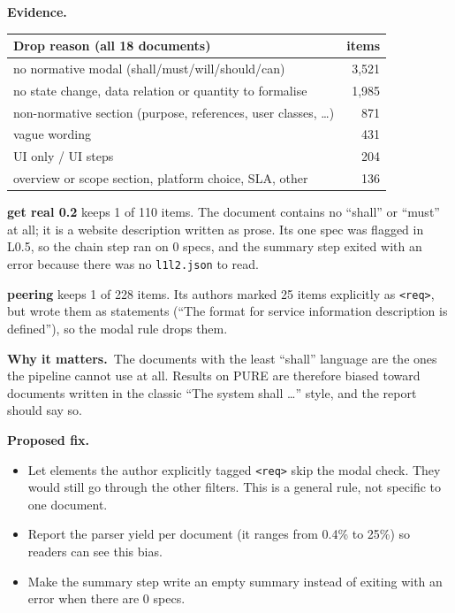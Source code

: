 \documentclass[10pt,a4paper]{article}
\newcommand{\code}[1]{\texttt{\small #1}}
\newcommand{\evidence}{\par\smallskip\textbf{Evidence.}~}
\newcommand{\why}{\par\smallskip\textbf{Why it matters.}~}
\newcommand{\fix}{\par\smallskip\textbf{Proposed fix.}~}
\begin{document}
\evidence
\begin{center}
\begin{tabular}{@{}lr@{}}
\toprule
Drop reason (all 18 documents) & items \\
\midrule
no normative modal (shall/must/will/should/can)                  & 3{,}521 \\
no state change, data relation or quantity to formalise          & 1{,}985 \\
non-normative section (purpose, references, user classes, \dots) & 871 \\
vague wording                                                    & 431 \\
UI only / UI steps                                               & 204 \\
overview or scope section, platform choice, SLA, other           & 136 \\
\bottomrule
\end{tabular}
\end{center}
\textbf{get real 0.2} keeps 1 of 110 items. The document contains no ``shall'' or ``must'' at all; it is a website description
written as prose. Its one spec was flagged in L0.5, so the chain step ran on 0 specs, and the summary step exited with an
error because there was no \code{l1l2.json} to read.

\textbf{peering} keeps 1 of 228 items. Its authors marked 25 items explicitly as \code{<req>}, but wrote them as statements
(``The format for service information description is defined''), so the modal rule drops them.

\why The documents with the least ``shall'' language are the ones the pipeline cannot use at all. Results on PURE are
therefore biased toward documents written in the classic ``The system shall \dots'' style, and the report should say so.

\fix
\begin{itemize}
\item Let elements the author explicitly tagged \code{<req>} skip the modal check. They would still go through the other
      filters. This is a general rule, not specific to one document.
\item Report the parser yield per document (it ranges from 0.4\% to 25\%) so readers can see this bias.
\item Make the summary step write an empty summary instead of exiting with an error when there are 0 specs.
\end{itemize}
\end{document}
